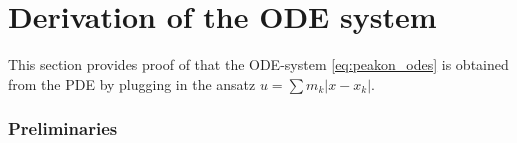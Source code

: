 \documentclass[english,master]{liumaiex}
\theoremstyle{plain}
\theoremstyle{definition}
\begin{document}
%
%
\newpage
\appendix

\section{Derivation of the ODE system} \label{sec:DerivationODE}

This section provides proof of that the ODE-system \eqref{eq:peakon_odes} is obtained from the PDE by plugging in the ansatz $u = \sum m_k |x - x_k|$.

\subsubsection*{Preliminaries}
\end{document}
